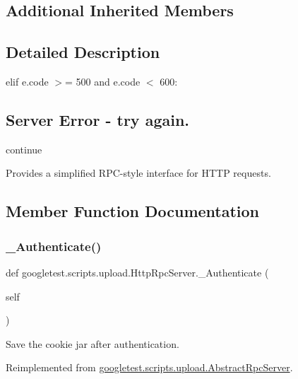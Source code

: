 \subsection*{Additional Inherited Members}


\subsection{Detailed Description}
elif e.\+code $>$= 500 and e.\+code $<$ 600\+: 

\subsection*{Server Error -\/ try again.}

continue \begin{DoxyVerb}Provides a simplified RPC-style interface for HTTP requests.\end{DoxyVerb}
 

\subsection{Member Function Documentation}
\mbox{\label{classgoogletest_1_1scripts_1_1upload_1_1_http_rpc_server_a6a2403ba3834ce8b4b9e1c14eb897cfb}} 
\subsubsection{\texorpdfstring{\_Authenticate()}{\_Authenticate()}}
{\footnotesize\ttfamily def googletest.\+scripts.\+upload.\+Http\+Rpc\+Server.\+\_\+\+Authenticate (\begin{DoxyParamCaption}\item[{}]{self }\end{DoxyParamCaption})\hspace{0.3cm}{\ttfamily [private]}}

\begin{DoxyVerb}Save the cookie jar after authentication.\end{DoxyVerb}
 

Reimplemented from \mbox{\hyperlink{classgoogletest_1_1scripts_1_1upload_1_1_abstract_rpc_server_a6df1e9f6492ff2fb80fa4206d64abbf1}{googletest.\+scripts.\+upload.\+Abstract\+Rpc\+Server}}.

